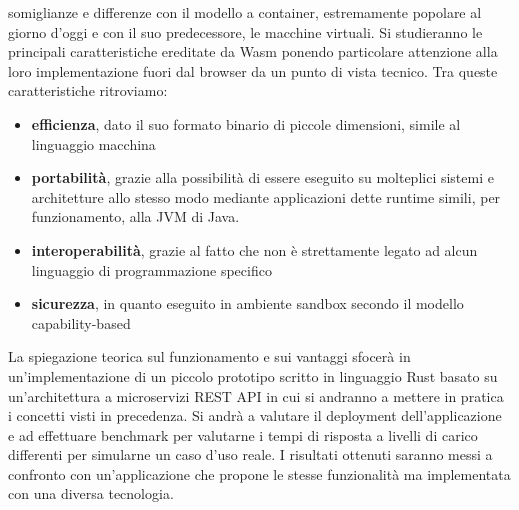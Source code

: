 somiglianze e differenze con il modello a container, estremamente popolare al giorno d'oggi e con il suo predecessore,
le macchine virtuali. Si studieranno le principali caratteristiche ereditate  da Wasm ponendo particolare attenzione
alla loro implementazione fuori dal browser da un punto di vista tecnico. Tra queste caratteristiche ritroviamo:
\begin{itemize}
    \item \textbf{efficienza}, dato il suo formato binario di piccole dimensioni, simile al linguaggio macchina
    \item \textbf{portabilità}, grazie alla possibilità di essere eseguito su molteplici sistemi e architetture allo
    stesso modo mediante applicazioni dette runtime simili, per funzionamento, alla JVM di Java.
    \item \textbf{interoperabilità}, grazie al fatto che non è strettamente legato ad alcun linguaggio di programmazione
    specifico
    \item \textbf{sicurezza}, in quanto eseguito in ambiente sandbox secondo il modello capability-based
\end{itemize}

La spiegazione teorica sul funzionamento e sui vantaggi sfocerà in un'implementazione di un piccolo prototipo scritto in
linguaggio Rust basato su un'architettura a microservizi REST API in cui si andranno a mettere in pratica i concetti
visti in precedenza. Si andrà a valutare il deployment dell'applicazione e ad effettuare benchmark per valutarne i tempi
di risposta a livelli di carico differenti per simularne un caso d'uso reale. I risultati ottenuti saranno messi a
confronto con un'applicazione che propone le stesse funzionalità ma implementata con una diversa tecnologia.